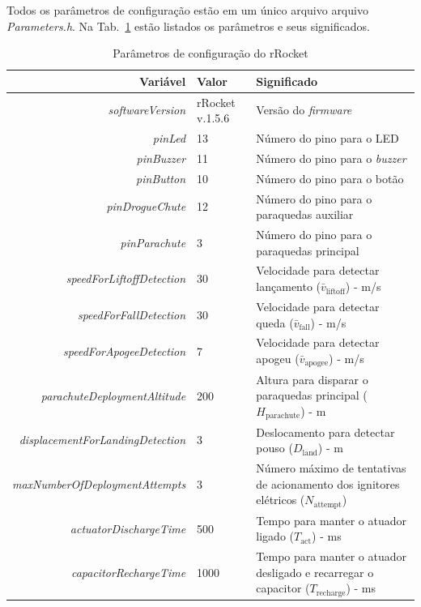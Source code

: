 \documentclass[12pt,a4paper]{article}
\begin{document}
Todos os parâmetros de configuração estão em um único arquivo arquivo \textit{Parameters.h}. Na Tab.~\ref{tab:parameters} estão listados os parâmetros e seus significados.

\begin{table}[!ht]
	\centering
\caption{Parâmetros de configuração do rRocket}
	\small
\begin{tabular}{r|p{1.5cm}|p{9cm}}
\hline
\hline
Variável&Valor&Significado\\
\hline
\textit{softwareVersion}&rRocket v.1.5.6& Versão do \textit{firmware}\\
\textit{pinLed}&13 &Número do pino para o LED\\
\textit{pinBuzzer}&11& Número do pino para o \textit{buzzer}\\
\textit{pinButton}&10&Número do pino para o botão\\
\textit{pinDrogueChute}&12&Número do pino para o paraquedas auxiliar\\
\textit{pinParachute}&3&Número do pino para o paraquedas principal\\
\textit{speedForLiftoffDetection}&30&Velocidade para detectar lançamento ($\bar{v}_\text{liftoff}$) - m/s\\
\textit{speedForFallDetection}&30&Velocidade para detectar queda ($\bar{v}_\text{fall}$) - m/s\\
\textit{speedForApogeeDetection}&7&Velocidade para detectar apogeu ($\bar{v}_\text{apogee}$) - m/s\\
\textit{parachuteDeploymentAltitude}&200&Altura para disparar o paraquedas principal ($H_\text{parachute}$) - m\\
\textit{displacementForLandingDetection}&3&Deslocamento para detectar pouso ($D_\text{land}$) - m\\
\textit{maxNumberOfDeploymentAttempts}&3&Número máximo de tentativas de acionamento dos ignitores elétricos ($N_\text{attempt}$)\\
\textit{actuatorDischargeTime}&500&Tempo para manter o atuador ligado ($T_\text{act}$) - ms\\
\textit{capacitorRechargeTime}&1000&Tempo para manter o atuador desligado e recarregar o capacitor ($T_\text{recharge}$) - ms\\
\hline
\hline
\end{tabular}
\label{tab:parameters}
\end{table}
\end{document}
